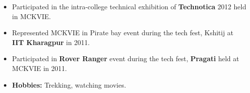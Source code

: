 \documentclass{article}
\begin{document}
\vspace{-3mm}
\begin{itemize}
\setlength{\itemsep}{-0.20em}
\item Participated in the intra-college technical exhibition of \textbf{Technotica} 2012 held in MCKVIE.
\item Represented MCKVIE in Pirate bay event during the tech fest, Kshitij at \textbf{IIT Kharagpur} in 2011.
\item Participated in \textbf{Rover Ranger} event during the tech fest, \textbf{Pragati} held at MCKVIE in 2011.
\item \textbf{Hobbies:} Trekking, watching movies.
\end{itemize}
\end{document}
